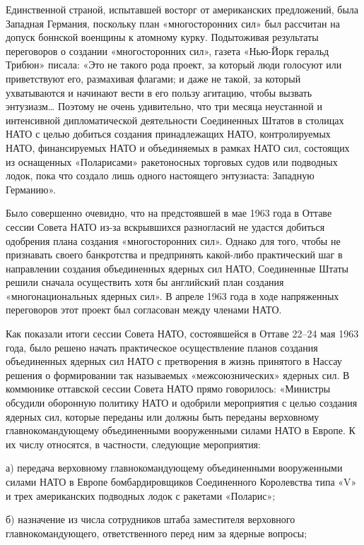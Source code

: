 \documentclass[12pt, a4paper, openany]{book}
\begin{document}
Единственной страной, испытавшей восторг от американских предложений, была Западная Германия, поскольку план «многосторонних сил» был рассчитан на допуск боннской военщины к атомному курку. Подытоживая результаты переговоров о создании «многосторонних сил», газета «Нью-Йорк геральд Трибюн» писала: «Это не такого рода проект, за который люди голосуют или приветствуют его, размахивая флагами; и даже не такой, за который ухватываются и начинают вести в его пользу агитацию, чтобы вызвать энтузиазм… Поэтому не очень удивительно, что три месяца неустанной и интенсивной дипломатической деятельности Соединенных Штатов в столицах НАТО с целью добиться создания принадлежащих НАТО, контролируемых НАТО, финансируемых НАТО и объединяемых в рамках НАТО сил, состоящих из оснащенных «Поларисами» ракетоносных торговых судов или подводных лодок, пока что создало лишь одного настоящего энтузиаста: Западную Германию».

Было совершенно очевидно, что на предстоявшей в мае 1963 года в Оттаве сессии Совета НАТО из-за вскрывшихся разногласий не удастся добиться одобрения плана создания «многосторонних сил». Однако для того, чтобы не признавать своего банкротства и предпринять какой-либо практический шаг в направлении создания объединенных ядерных сил НАТО, Соединенные Штаты решили сначала осуществить хотя бы английский план создания «многонациональных ядерных сил». В апреле 1963 года в ходе напряженных переговоров этот проект был согласован между членами НАТО.

Как показали итоги сессии Совета НАТО, состоявшейся в Оттаве 22–24 мая 1963 года, было решено начать практическое осуществление планов создания объединенных ядерных сил НАТО с претворения в жизнь принятого в Нассау решения о формировании так называемых «межсоюзнических» ядерных сил. В коммюнике оттавской сессии Совета НАТО прямо говорилось: «Министры обсудили оборонную политику НАТО и одобрили мероприятия с целью создания ядерных сил, которые переданы или должны быть переданы верховному главнокомандующему объединенными вооруженными силами НАТО в Европе. К их числу относятся, в частности, следующие мероприятия:

а) передача верховному главнокомандующему объединенными вооруженными силами НАТО в Европе бомбардировщиков Соединенного Королевства типа «V» и трех американских подводных лодок с ракетами «Поларис»;

б) назначение из числа сотрудников штаба заместителя верховного главнокомандующего, ответственного перед ним за ядерные вопросы;
\end{document}
